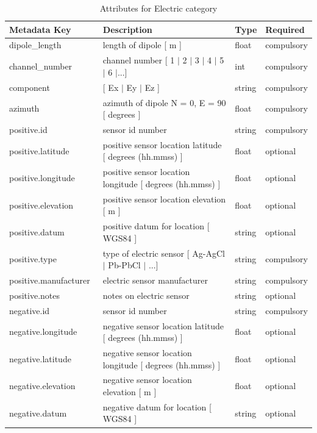 \documentclass{article}
\begin{document}
\begin{table}[htb!]
    \caption[Attributes for Electric Channel]{Attributes for Electric category}
    \begin{tabular}{|l|p{3in}|l|l|}
        \hline
        \textbf{Metadata Key} & \textbf{Description} & \textbf{Type} & \textbf{Required} \\ \hline
        dipole\_length\ & length of dipole [ m ] & float & compulsory \\ \hline
        channel\_number\ & channel number [ 1 $|$ 2 $|$ 3 $|$ 4 $|$ 5 $|$ 6 $|$...] & int & compulsory \\ \hline
        component\ & [ Ex $|$ Ey $|$ Ez ] & string  & compulsory \\ \hline
        azimuth\ & azimuth of dipole N = 0,  E = 90 [ degrees ] & float & compulsory \\ \hline
        positive.id\ & sensor id number & string & compulsory \\ \hline
        positive.latitude\ & positive sensor location latitude [ degrees (hh.mmss) ] & float & optional \\ \hline
        positive.longitude\ & positive sensor location longitude [ degrees (hh.mmss) ] & float & optional \\ \hline
        positive.elevation\ & positive sensor location elevation [ m ] & float & optional \\ \hline
        positive.datum\ & positive datum for location [ WGS84 ] & string & optional \\ \hline
        positive.type\ & type of electric sensor [ Ag-AgCl $|$ Pb-PbCl $|$ ...] & string & compulsory \\ \hline
        positive.manufacturer\ & electric sensor manufacturer & string & compulsory \\ \hline
        positive.notes\ & notes on electric sensor & string & optional \\ \hline
        negative.id\ & sensor id number & string & compulsory \\ \hline
        negative.longitude\ & negative sensor location latitude [ degrees (hh.mmss) ] & float & optional \\ \hline
        negative.latitude\ & negative sensor location longitude [ degrees (hh.mmss) ] & float & optional \\ \hline
        negative.elevation\ & negative sensor location elevation [ m ] & float & optional \\ \hline
        negative.datum\ & negative datum for location [ WGS84 ] & string & optional \\ \hline

\end{tabular}
\end{table}
\end{document}
